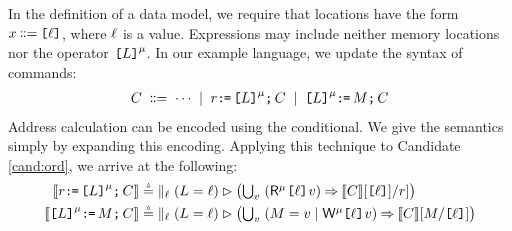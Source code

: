 
In the definition of a data model, we require
that locations have the form $x\!\!\;\mathrel{\mathord{\vcentcolon}\mkern-1mu\mathord{\vcentcolon}\mathord{{=}}}\;\!\!\texttt{[}\ell\texttt{]}$, where $\ell$
is a value.  Expressions may include neither memory locations nor the
operator $\texttt{[}L\texttt{]}^{\mu}$.
In our example language, we update the syntax of commands:
\begin{gather*}
  C
  \;\mathrel{\mathord{\vcentcolon}\mkern-1mu\mathord{\vcentcolon}\mathord{{=}}}\; \cdots
  \;\mathrel{|}\; r\texttt{:}\mkern-1mu\texttt{=}\,\texttt{[}L\texttt{]}^{\mu}\texttt{;}\,\allowbreak C 
  \;\mathrel{|}\; \texttt{[}L\texttt{]}^{\mu}\texttt{:}\mkern-1mu\texttt{=}\,M\texttt{;}\,\allowbreak C
\end{gather*}
Address calculation can be encoded using the conditional.  We give the
semantics simply by expanding this encoding.  Applying this technique to Candidate
\ref{cand:ord}, we arrive at the following:
  \begin{align*}
  \sem{\aReg\GETS\REF{\cExp}^\amode\SEMI \aCmd} & \eqdef
    \;\textstyle\parallel_\cVal (\cExp=\cVal) \guard \bigl(
    \textstyle\bigcup_\aVal\;
    (\DRmode{\REF{\cVal}}\aVal) \prefix \sem{\aCmd} [\REF{\cVal}]/\aReg]
    \bigr)
    \\
  \sem{\REF{\cExp}^\amode\GETS\aExp\SEMI \aCmd} & \eqdef
    \;\textstyle\parallel_\cVal (\cExp=\cVal) \guard 
    \bigl(\textstyle\bigcup_\aVal\; (\aExp=\aVal \mid \DWmode{\REF{\cVal}}\aVal) \prefix \sem{\aCmd}[\aExp/\REF{\cVal}]\bigr)
  \end{align*}
